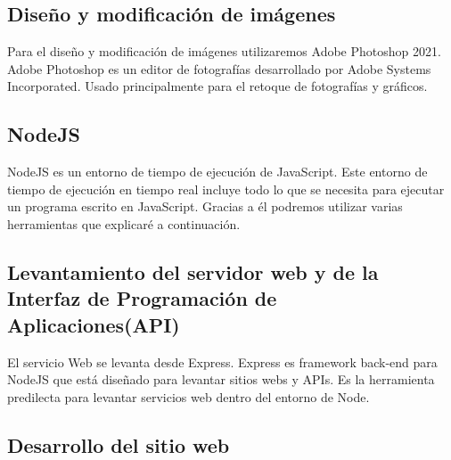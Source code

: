 \subsection{Diseño y modificación de imágenes}

Para el diseño y modificación de imágenes utilizaremos Adobe Photoshop 2021. Adobe Photoshop es un editor de fotografías desarrollado por Adobe Systems Incorporated. Usado principalmente para el retoque de fotografías y gráficos.

\subsection{NodeJS}

NodeJS es un entorno de tiempo de ejecución de JavaScript. Este entorno de tiempo de ejecución en tiempo real incluye todo lo que se necesita para ejecutar un programa escrito en JavaScript. Gracias a él podremos utilizar varias herramientas que explicaré a continuación.

\subsection{Levantamiento del servidor web y de la Interfaz de Programación de Aplicaciones(API)}

El servicio Web se levanta desde Express. Express es framework back-end para NodeJS que está diseñado para levantar sitios webs y APIs. Es la herramienta predilecta para levantar servicios web dentro del entorno de Node.

\subsection{Desarrollo del sitio web}

